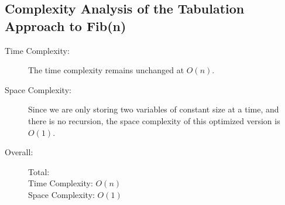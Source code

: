 \subsection{Complexity Analysis of the Tabulation Approach to Fib(n)}

\begin{description}
    \item[Time Complexity:]
        The time complexity remains unchanged at $O(n)$.

    \item[Space Complexity:] 
        Since we are only storing two variables of constant size at a time,
        and there is no recursion, the space complexity of this optimized version is $O(1)$.

    \item[Overall:] Total:\\
        Time Complexity: $O(n)$\\
        Space Complexity: $O(1)$
        
\end{description}
\newpage

